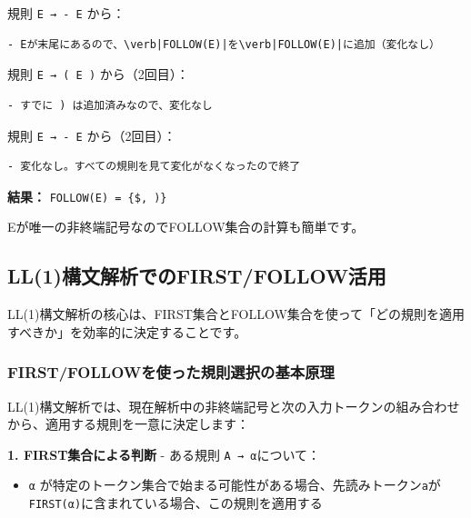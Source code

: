 規則 \texttt{E\ →\ -\ E} から：

\begin{verbatim}
- Eが末尾にあるので、\verb|FOLLOW(E)|を\verb|FOLLOW(E)|に追加（変化なし）
\end{verbatim}

規則 \texttt{E\ →\ (\ E\ )} から（2回目）：

\begin{verbatim}
- すでに ) は追加済みなので、変化なし
\end{verbatim}

規則 \texttt{E\ →\ -\ E} から（2回目）：

\begin{verbatim}
- 変化なし。すべての規則を見て変化がなくなったので終了
\end{verbatim}

\textbf{結果：}
\texttt{FOLLOW(E)\ =\ \{\$,\ \textquotesingle{})\textquotesingle{}\}}

Eが唯一の非終端記号なのでFOLLOW集合の計算も簡単です。

\hypertarget{chapter5-ll1ux69cbux6587ux89e3ux6790ux3067ux306efirstfollowux6d3bux7528}{%
\subsection{LL(1)構文解析でのFIRST/FOLLOW活用}\label{chapter5-ll1ux69cbux6587ux89e3ux6790ux3067ux306efirstfollowux6d3bux7528}}

LL(1)構文解析の核心は、FIRST集合とFOLLOW集合を使って「どの規則を適用すべきか」を効率的に決定することです。

\hypertarget{chapter5-firstfollowux3092ux4f7fux3063ux305fux898fux5247ux9078ux629eux306eux57faux672cux539fux7406}{%
\subsubsection{FIRST/FOLLOWを使った規則選択の基本原理}\label{chapter5-firstfollowux3092ux4f7fux3063ux305fux898fux5247ux9078ux629eux306eux57faux672cux539fux7406}}

LL(1)構文解析では、現在解析中の非終端記号と次の入力トークンの組み合わせから、適用する規則を一意に決定します：

\textbf{1. FIRST集合による判断} - ある規則 \texttt{A\ →\ α}について：
\begin{itemize}
\item \texttt{α} が特定のトークン集合で始まる可能性がある場合、先読みトークン\texttt{a}が\texttt{FIRST(α)}に含まれている場合、この規則を適用する
\end{itemize}

